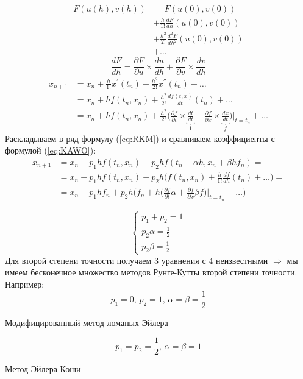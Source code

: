 \documentclass[a4paper,11pt]{article}
\begin{document}
\begin{align*}
  F(u(h), v(h)) &= F(u(0), v(0)) \\
                &+ \frac{h}{1!} \frac{dF}{dh}(u(0), v(0)) \\
                &+ \frac{h^2}{2!} \frac{d^2F}{dh^2}(u(0), v(0)) \\
                &+ \dots
\end{align*}
\[\frac{dF}{dh} = \frac{\partial F}{\partial u} \times \frac{du}{dh} + \frac{\partial F}{\partial v} \times \frac{dv}{dh}\]
\begin{equation}
  \begin{aligned}
    x_{n+1} &= x_n + \frac{h}{1!}x^{'}(t_n) + \frac{h^2}{2!}x^{''}(t_n) + \dots \\
            &= x_n + hf(t_n, x_n) + \frac{h^2}{2!}\frac{df(t, x)}{dt}(t_n) + \dots \\
            &= x_n + hf(t_n, x_n) + \frac{h^2}{2!}\Big (\frac{\partial f}{\partial t} \times \underbrace{\frac{dt}{dt}}_{1} + \frac{\partial f}{\partial x} \times \underbrace{\frac{dx}{dt}}_{f}\Big ) \Big |_{t=t_n} + \dots
  \end{aligned}
  \label{eq:KAWO}
\end{equation}
Раскладываем в ряд формулу (\ref{eq:RKM}) и сравниваем коэффициенты с формулой (\ref{eq:KAWO}):
\begin{align*}
  x_{n+1} &= x_n + p_1hf(t_n, x_n) + p_2hf(t_n + \alpha h, x_n + \beta hf_n) = \\
          &= x_n + p_1hf(t_n, x_n) + p_2h\Big(f(t_n, x_n) + \frac{h}{1!}\frac{df}{dh}(t_n) + \dots\Big) = \\
          &= x_n + p_1hf_n + p_2h\Big(f_n + h\Big(\frac{\partial f}{\partial t}\alpha + \frac{\partial f}{\partial x}\beta f \Big)\Big |_{t=t_n} + \dots\Big)
\end{align*}
\begin{importantblock}
  \begin{equation*}
    \begin{cases}
      p_1 + p_2 = 1 \\
      p_2\alpha = \frac{1}{2} \\
      p_2\beta = \frac{1}{2}
    \end{cases}
  \end{equation*}
  Для второй степени точности получаем $3$ уравнения с $4$ неизвестными $\Rightarrow$ мы имеем бесконечное множество методов Рунге-Кутты второй степени точности. \\
  Например:
  \[p_1 = 0,\, p_2 = 1,\, \alpha = \beta = \frac{1}{2}\]
  \begin{center}
    \small{Модифицированный метод ломаных Эйлера}
  \end{center}
  \[p_1 = p_2 = \frac{1}{2},\, \alpha = \beta = 1\]
  \begin{center}
    \small{Метод Эйлера-Коши}
  \end{center}
\end{importantblock}
\end{document}
